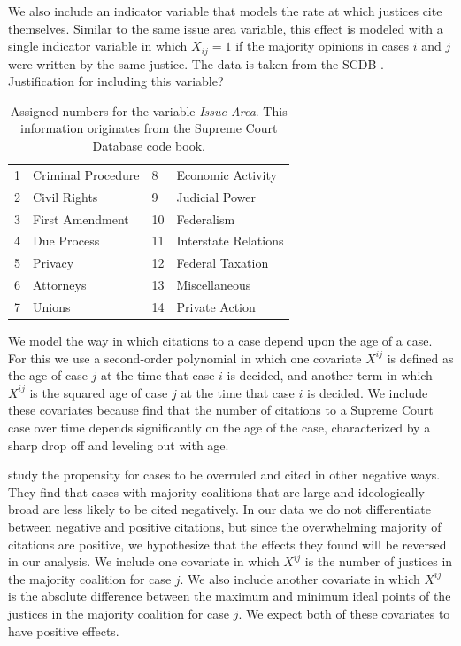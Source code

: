\documentclass[headsepline=true, abstracton]{scrartcl}
\begin{document}
We also include an indicator variable that models the rate at which justices cite themselves. Similar to the same issue area variable, this effect is modeled with a single indicator variable in which $X_{ij} = 1$ if the majority opinions in cases $i$ and $j$ were written by the same justice. The data is taken from the SCDB \citep{spaeth2014supreme}. {\color{blue} Justification for including this variable? }

\begin{table}[]
\centering
\begin{tabular}{llll}
1 & Criminal Procedure & 8  & Economic Activity    \\
2 & Civil Rights       & 9  & Judicial Power       \\
3 & First Amendment    & 10 & Federalism           \\
4 & Due Process        & 11 & Interstate Relations \\
5 & Privacy            & 12 & Federal Taxation     \\
6 & Attorneys          & 13 & Miscellaneous        \\
7 & Unions             & 14 & Private Action      
\end{tabular}
\caption{Assigned numbers for the variable \textit{Issue Area}. This information originates from the Supreme Court Database code book.}
\label{issue_area_coding}
\end{table}

We model the way in which citations to a case depend upon the age of a case. For this we use a second-order polynomial in which one covariate $X^{ij}$ is defined as the age of case $j$ at the time that case $i$ is decided, and another term in which $X^{ij}$ is the squared age of case $j$ at the time that case $i$ is decided. We include these covariates because \citet{black2013citation} find that the number of citations to a Supreme Court case over time depends significantly on the age of the case, characterized by a sharp drop off and leveling out with age. 

\citet{benjamin2012standing} study the propensity for cases to be overruled and cited in other negative ways. They find that cases with majority coalitions that are large and ideologically broad are less likely to be cited negatively. In our data we do not differentiate between negative and positive citations, but since the overwhelming majority of citations are positive, we hypothesize that the effects they found will be reversed in our analysis. We include one covariate in which $X^{ij}$ is the number of justices in the majority coalition for case $j$. We also include another covariate in which $X^{ij}$ is the absolute difference between the maximum and minimum ideal points of the justices in the majority coalition for case $j$. We expect both of these covariates to have positive effects.
\end{document}
